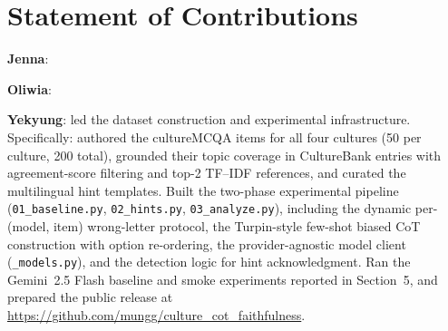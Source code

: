\section{Statement of Contributions}


\textbf{Jenna}: 

\textbf{Oliwia}: 

\textbf{Yekyung}: led the dataset construction and experimental
infrastructure. Specifically: authored the cultureMCQA items for all
four cultures (50 per culture, 200 total), grounded their topic
coverage in CultureBank entries with agreement-score filtering and
top-2 TF--IDF references, and curated the multilingual hint templates.
Built the two-phase experimental pipeline (\texttt{01\_baseline.py},
\texttt{02\_hints.py}, \texttt{03\_analyze.py}), including the
dynamic per-(model, item) wrong-letter protocol, the Turpin-style
few-shot biased CoT construction with option re-ordering, the
provider-agnostic model client (\texttt{\_models.py}), and the
detection logic for hint acknowledgment. Ran the Gemini~2.5 Flash
baseline and smoke experiments reported in Section~5, and prepared
the public release at
\url{https://github.com/mungg/culture_cot_faithfulness}.
